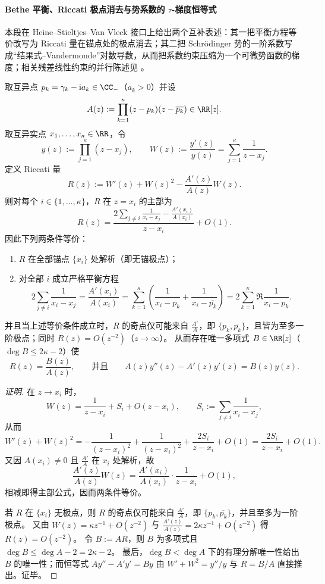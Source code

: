 
\paragraph{Bethe 平衡、Riccati 极点消去与势系数的 \texorpdfstring{$\tau$}{tau}-梯度恒等式}
本段在 Heine--Stieltjes--Van Vleck 接口上给出两个互补表述：其一把平衡方程等价改写为 Riccati 量在锚点处的极点消去；其二把 Schr\"odinger 势的一阶系数写成“结果式--Vandermonde”对数导数，从而把系数约束压缩为一个可微势函数的梯度；相关残差线性约束的并行陈述见 \cite{Internal2026ToeplitzScanHankelBlaschkeVanVleck}。

\begin{conclusion}\label{con:xi-terminal-riccati-pole-cancellation-bethe-equilibrium}
取互异点 \(p_k=\gamma_k-\mathrm{i}a_k\in\CC_{-}\)（\(a_k>0\)）并设
\[
A(z):=\prod_{k=1}^{\kappa}(z-p_k)(z-\overline{p_k})\in\RR[z].
\]
取互异实点 \(x_1,\dots,x_\kappa\in\RR\)，令
\[
y(z):=\prod_{j=1}^{\kappa}(z-x_j),\qquad
W(z):=\frac{y'(z)}{y(z)}=\sum_{j=1}^{\kappa}\frac{1}{z-x_j}.
\]
定义 Riccati 量
\[
R(z):=W'(z)+W(z)^2-\frac{A'(z)}{A(z)}W(z).
\]
则对每个 \(i\in\{1,\dots,\kappa\}\)，\(R\) 在 \(z=x_i\) 的主部为
\[
R(z)=\frac{2\sum_{j\ne i}\frac{1}{x_i-x_j}-\frac{A'(x_i)}{A(x_i)}}{z-x_i}+O(1).
\]
因此下列两条件等价：
\begin{enumerate}
  \item \(R\) 在全部锚点 \(\{x_i\}\) 处解析（即无锚极点）；
  \item 对全部 \(i\) 成立严格平衡方程
  \[
  2\sum_{j\ne i}\frac{1}{x_i-x_j}
  =\frac{A'(x_i)}{A(x_i)}
  =\sum_{k=1}^{\kappa}\left(\frac{1}{x_i-p_k}+\frac{1}{x_i-\overline{p_k}}\right)
  =2\sum_{k=1}^{\kappa}\Re\frac{1}{x_i-p_k}.
  \]
\end{enumerate}
并且当上述等价条件成立时，\(R\) 的奇点仅可能来自 \(\frac{A'}{A}\)，即 \(\{p_k,\overline{p_k}\}\)，且皆为至多一阶极点；同时 \(R(z)=O(z^{-2})\)（\(z\to\infty\)）。
从而存在唯一多项式 \(B\in\RR[z]\)（\(\deg B\le 2\kappa-2\)）使
\[
R(z)=\frac{B(z)}{A(z)},
\qquad\text{并且}\qquad
A(z)y''(z)-A'(z)y'(z)=B(z)y(z).
\]
\end{conclusion}
\begin{proof}[证明]
在 \(z\to x_i\) 时，
\[
W(z)=\frac{1}{z-x_i}+S_i+O(z-x_i),\qquad S_i:=\sum_{j\ne i}\frac{1}{x_i-x_j},
\]
从而
\[
W'(z)+W(z)^2
=-\frac{1}{(z-x_i)^2}+\frac{1}{(z-x_i)^2}+\frac{2S_i}{z-x_i}+O(1)
=\frac{2S_i}{z-x_i}+O(1).
\]
又因 \(A(x_i)\neq 0\) 且 \(\frac{A'}{A}\) 在 \(x_i\) 处解析，故
\[
\frac{A'(z)}{A(z)}W(z)=\frac{A'(x_i)}{A(x_i)}\cdot\frac{1}{z-x_i}+O(1),
\]
相减即得主部公式，因而两条件等价。
\par
若 \(R\) 在 \(\{x_i\}\) 无极点，则 \(R\) 的奇点仅可能来自 \(\frac{A'}{A}\)，即 \(\{p_k,\overline{p_k}\}\)，并且至多为一阶极点。
又由
\(
W(z)=\kappa z^{-1}+O(z^{-2})
\)
与
\(
\frac{A'(z)}{A(z)}=2\kappa z^{-1}+O(z^{-2})
\)
得 \(R(z)=O(z^{-2})\)。
令 \(B:=AR\)，则 \(B\) 为多项式且 \(\deg B\le \deg A-2=2\kappa-2\)。
最后，\(\deg B<\deg A\) 下的有理分解唯一性给出 \(B\) 的唯一性；而恒等式
\(
A y''-A'y'=By
\)
由
\(
W'+W^2=y''/y
\)
与 \(R=B/A\) 直接推出。证毕。
\end{proof}

